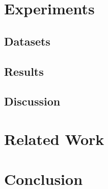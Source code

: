 \documentclass[11pt]{article}
\begin{document}
\section{Experiments}
\subsection{Datasets} \label{sec:data}
\subsection{Results}
\subsection{Discussion}

\section{Related Work}


\section{Conclusion}


\end{document}
